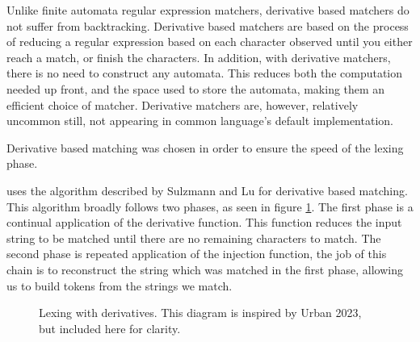 Unlike finite automata regular expression matchers, derivative based matchers do not suffer from backtracking. Derivative based matchers are based on the process of reducing a regular expression based on each character observed until you either reach a match, or finish the characters\cite{UrbanposixDerivatives, BrzozowskiDerivatives, SulzmanPosix}.
In addition, with derivative matchers, there is no need to construct any automata. This reduces both the computation needed up front, and the space used to store the automata, making them an efficient choice of matcher. 
Derivative matchers are, however, relatively uncommon still, not appearing in common language's default implementation. 

Derivative based matching was chosen in order to ensure the speed of the lexing phase\cite{SulzmanPosix}.

\rimp uses the algorithm described by Sulzmann and Lu\cite{SulzmanPosix} for derivative based matching. 
This algorithm broadly follows two phases, as seen in figure \ref{fig:lexing}. The first phase is a continual application of the derivative function. This function reduces the input string to be matched until there are no remaining characters to match. The second phase is repeated application of the injection function, the job of this chain is to reconstruct the string which was matched in the first phase, allowing us to build tokens from the strings we match.

\begin{center}
\begin{figure}[hbt!]
\centering
{}
\caption{Lexing with derivatives. This diagram is inspired by Urban 2023\cite{UrbanposixDerivatives, UrbanTan}, but included here for clarity.}
\label{fig:lexing}
\end{figure}
\end{center}

